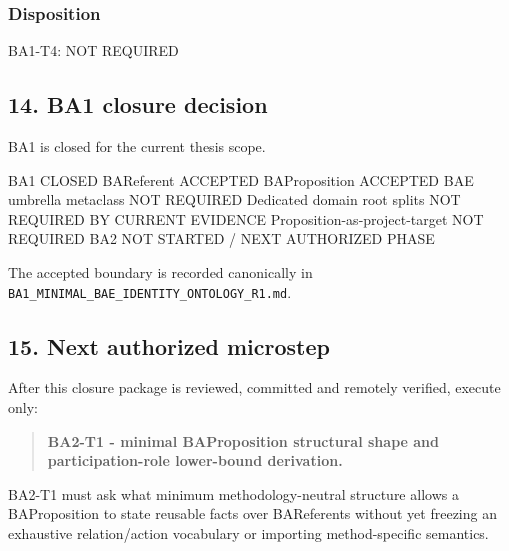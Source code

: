 \documentclass[
  10pt,
  a4paper,
]{article}
\newenvironment{Shaded}{}{}
\newcommand{\NormalTok}[1]{#1}
\begin{document}
\subsubsection{Disposition}\label{disposition-2}

\begin{Shaded}
\begin{Highlighting}[]
\NormalTok{BA1{-}T4: NOT REQUIRED}
\end{Highlighting}
\end{Shaded}

\subsection{14. BA1 closure decision}\label{ba1-closure-decision}

BA1 is closed for the current thesis scope.

\begin{Shaded}
\begin{Highlighting}[]
\NormalTok{BA1                             CLOSED}
\NormalTok{BAReferent                      ACCEPTED}
\NormalTok{BAProposition                   ACCEPTED}
\NormalTok{BAE umbrella metaclass          NOT REQUIRED}
\NormalTok{Dedicated domain root splits    NOT REQUIRED BY CURRENT EVIDENCE}
\NormalTok{Proposition{-}as{-}project{-}target   NOT REQUIRED}
\NormalTok{BA2                             NOT STARTED / NEXT AUTHORIZED PHASE}
\end{Highlighting}
\end{Shaded}

The accepted boundary is recorded canonically in
\texttt{BA1\_MINIMAL\_BAE\_IDENTITY\_ONTOLOGY\_R1.md}.

\subsection{15. Next authorized
microstep}\label{next-authorized-microstep}

After this closure package is reviewed, committed and remotely verified,
execute only:

\begin{quote}
\textbf{BA2-T1 - minimal BAProposition structural shape and
participation-role lower-bound derivation.}
\end{quote}

BA2-T1 must ask what minimum methodology-neutral structure allows a
BAProposition to state reusable facts over BAReferents without yet
freezing an exhaustive relation/action vocabulary or importing
method-specific semantics.
\end{document}
